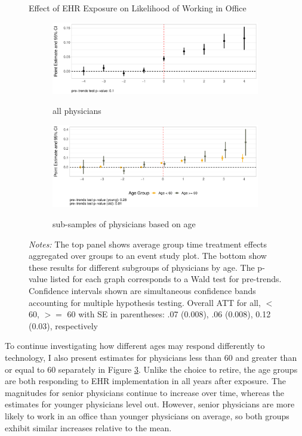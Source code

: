 \documentclass[12pt]{article}
\begin{document}
\begin{figure}[ht!]
\centering
    \captionsetup{width=.7\linewidth}
    \caption{Effect of EHR Exposure on Likelihood of Working in Office}
   \begin{subfigure}[]{.8\textwidth}
   \caption{all physicians}
   \includegraphics[scale=.45]{Objects/officeind_plot_all.pdf}
   \label{fig:officefirsta} 
\end{subfigure}

\vspace{3mm}

\begin{subfigure}[]{.8\textwidth}
\caption{sub-samples of physicians based on age}
   \includegraphics[scale=.45]{Objects/officeind_plot_ages.pdf}
   \label{fig:officefirstb}
\end{subfigure}
\vspace{2mm}
    \caption*{\footnotesize{\textit{Notes:} The top panel shows average group time treatment effects aggregated over groups to an event study plot. The bottom show these results for different subgroups of physicians by age. The p-value listed for each graph corresponds to a Wald test for pre-trends. Confidence intervals shown are simultaneous confidence bands accounting for multiple hypothesis testing. Overall ATT for all, $<$ 60, $>=$ 60 with SE in parentheses: .07 (0.008), .06 (0.008), 0.12 (0.03), respectively}}
\end{figure}


To continue investigating how different ages may respond differently to technology, I also present estimates for physicians less than 60 and greater than or equal to 60 separately in Figure \ref{fig:officefirstb}. Unlike the choice to retire, the age groups are both responding to EHR implementation in all years after exposure. The magnitudes for senior physicians continue to increase over time, whereas the estimates for younger physicians level out. However, senior physicians are more likely to work in an office than younger physicians on average, so both groups exhibit similar increases relative to the mean. 
\end{document}
